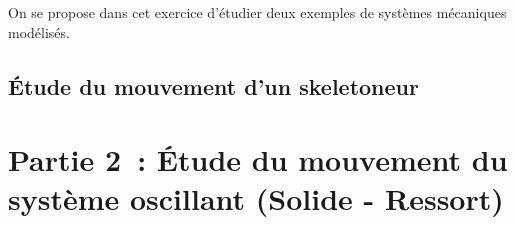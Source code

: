 On se propose dans cet exercice d'étudier deux exemples de systèmes mécaniques
modélisés.

\subsection{Étude du mouvement d'un skeletoneur}


\section*{Partie 2~: Étude du mouvement du système oscillant (Solide - Ressort)}


